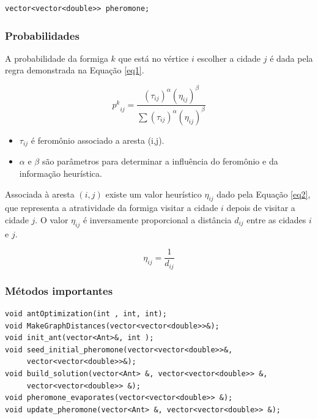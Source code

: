 \documentclass[a4paper, 12pt]{article}
\begin{document}
\begin{lstlisting}
vector<vector<double>> pheromone;
\end{lstlisting}

\subsubsection{Probabilidades}

A probabilidade da formiga $k$ que está no vértice $i$ escolher a cidade $j$ é dada pela regra demonstrada na Equação \ref{eq1}.

\begin{equation}
{p^k}_{ij} = \frac{(\tau_{ij})^\alpha(\eta_{ij})^\beta}{\sum(\tau_{ij})^\alpha(\eta_{ij})^\beta}
\label{eq1}
\end{equation}

\begin{itemize}
\item  $\tau_{ij}$ é feromônio associado a aresta (i,j).\\
\item $\alpha$ e $\beta$ são parâmetros para determinar a influência do feromônio e da informação heurística.\\
\end{itemize}

Associada à aresta $(i, j)$ existe um valor heurístico $\eta_{ij}$ dado pela Equação \ref{eq2}, que representa a atratividade da formiga visitar a cidade $i$ depois de visitar a cidade $j $. O valor $\eta_{ij}$ é inversamente proporcional a distância $d_{ij}$ entre as cidades $i$ e $j $. 

\begin{equation}
\eta_{ij} =\frac{1}{d_{ij}}
\label{eq2}
\end{equation}
\newpage
\subsubsection{Métodos importantes}

\begin{lstlisting}
void antOptimization(int , int, int);
void MakeGraphDistances(vector<vector<double>>&);
void init_ant(vector<Ant>&, int );
void seed_initial_pheromone(vector<vector<double>>&, 
     vector<vector<double>>&);
void build_solution(vector<Ant> &, vector<vector<double>> &, 
     vector<vector<double>> &);
void pheromone_evaporates(vector<vector<double>> &);
void update_pheromone(vector<Ant> &, vector<vector<double>> &);
\end{lstlisting}
\end{document}
